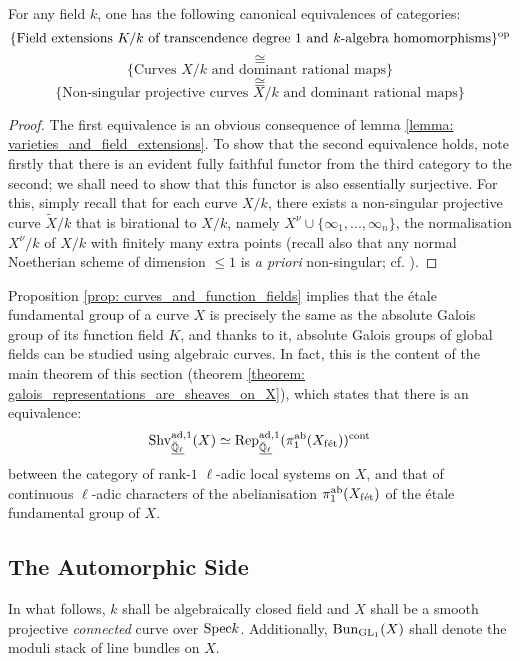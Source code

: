         \begin{proposition} \label{prop: curves_and_function_fields}
            \cite[\href{https://stacks.math.columbia.edu/tag/0BY1}{Tag 0BY1}]{stacks} For any field $k$, one has the following canonical equivalences of categories:
                $$\{\text{Field extensions $K/k$ of transcendence degree $1$ and $k$-algebra homomorphisms}\}^{\mathrm{op}}$$
                $$\cong$$
                $$\{\text{Curves $X/k$ and dominant rational maps}\}$$
                $$\cong$$
                $$\{\text{Non-singular projective curves $X/k$ and dominant rational maps}\}$$
        \end{proposition}
            \begin{proof}
                The first equivalence is an obvious consequence of lemma \ref{lemma: varieties_and_field_extensions}. To show that the second equivalence holds, note firstly that there is an evident fully faithful functor from the third category to the second; we shall need to show that this functor is also essentially surjective. For this, simply recall that for each curve $X/k$, there exists a non-singular projective curve $\tilde{X}/k$ that is birational to $X/k$, namely $X^{\nu} \cup \{\infty_1, ..., \infty_n\}$, the normalisation $X^{\nu}/k$ of $X/k$ with finitely many extra points (recall also that any normal Noetherian scheme of dimension $\leq 1$ is \textit{a priori} non-singular; cf. \cite[\href{https://stacks.math.columbia.edu/tag/0BX2}{Tag 0BX2}]{stacks}).
            \end{proof}
        Proposition \ref{prop: curves_and_function_fields} implies that the \'etale fundamental group of a curve $X$ is precisely the same as the absolute Galois group of its function field $K$, and thanks to it, absolute Galois groups of global fields can be studied using algebraic curves. In fact, this is the content of the main theorem of this section (theorem \ref{theorem: galois_representations_are_sheaves_on_X}), which states that there is an equivalence:
            $$\mathrm{Shv}^{\mathrm{ad}, 1}_{\underline{\bar{\mathbb{Q}}_{\ell}}}(X) \simeq \mathrm{Rep}^{\mathrm{ad}, 1}_{\underline{\bar{\mathbb{Q}}_{\ell}}}(\pi_1^{\mathrm{ab}}(X_{\mathrm{f\acute{e}t}}))^{\mathrm{cont}}$$
        between the category of rank-$1$ $\ell$-adic local systems on $X$, and that of continuous $\ell$-adic characters of the abelianisation $\pi_1^{\mathrm{ab}}(X_{\mathrm{f\acute{e}t}})$ of the \'etale fundamental group of $X$. 
    
    \subsection{The Automorphic Side}
        \begin{convention}
            In what follows, $k$ shall be algebraically closed field and $X$ shall be a smooth projective \textit{connected} curve over $\mathrm{Spec} k$. Additionally, $\mathrm{Bun}_{\operatorname{GL}_1}(X)$ shall denote the moduli stack of line bundles on $X$.
        \end{convention}
    
